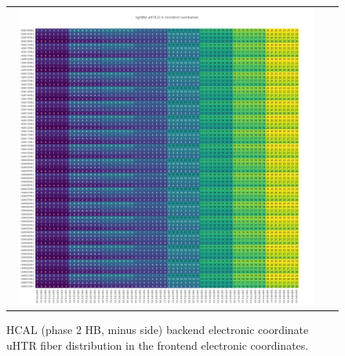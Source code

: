 \clearpage
\begin{figure}[htb]
 \begin{center}
  \begin{tabular}{cc}
   \includegraphics[angle=0,width=0.95\textwidth]{figures/appendix/ngHBM_uHTR_FI_in_FrontEnd.png}
  \end{tabular}
  \caption{HCAL (phase 2 HB, minus side) backend electronic coordinate uHTR fiber distribution in the frontend electronic coordinates.}
  \label{fig:lmapngHBMuHTRFIFEC}
 \end{center}
\end{figure}
